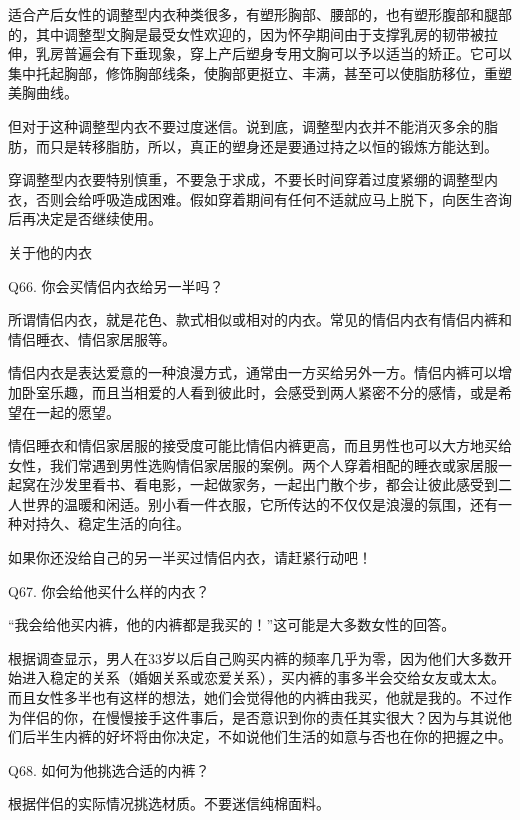 \documentclass[12pt,UTF8]{ctexbook}
\begin{document}
适合产后女性的调整型内衣种类很多，有塑形胸部、腰部的，也有塑形腹部和腿部的，其中调整型文胸是最受女性欢迎的，因为怀孕期间由于支撑乳房的韧带被拉伸，乳房普遍会有下垂现象，穿上产后塑身专用文胸可以予以适当的矫正。它可以集中托起胸部，修饰胸部线条，使胸部更挺立、丰满，甚至可以使脂肪移位，重塑美胸曲线。

但对于这种调整型内衣不要过度迷信。说到底，调整型内衣并不能消灭多余的脂肪，而只是转移脂肪，所以，真正的塑身还是要通过持之以恒的锻炼方能达到。

穿调整型内衣要特别慎重，不要急于求成，不要长时间穿着过度紧绷的调整型内衣，否则会给呼吸造成困难。假如穿着期间有任何不适就应马上脱下，向医生咨询后再决定是否继续使用。





关于他的内衣


Q66. 你会买情侣内衣给另一半吗？


所谓情侣内衣，就是花色、款式相似或相对的内衣。常见的情侣内衣有情侣内裤和情侣睡衣、情侣家居服等。

情侣内衣是表达爱意的一种浪漫方式，通常由一方买给另外一方。情侣内裤可以增加卧室乐趣，而且当相爱的人看到彼此时，会感受到两人紧密不分的感情，或是希望在一起的愿望。

情侣睡衣和情侣家居服的接受度可能比情侣内裤更高，而且男性也可以大方地买给女性，我们常遇到男性选购情侣家居服的案例。两个人穿着相配的睡衣或家居服一起窝在沙发里看书、看电影，一起做家务，一起出门散个步，都会让彼此感受到二人世界的温暖和闲适。别小看一件衣服，它所传达的不仅仅是浪漫的氛围，还有一种对持久、稳定生活的向往。

如果你还没给自己的另一半买过情侣内衣，请赶紧行动吧！





Q67. 你会给他买什么样的内衣？


“我会给他买内裤，他的内裤都是我买的！”这可能是大多数女性的回答。

根据调查显示，男人在33岁以后自己购买内裤的频率几乎为零，因为他们大多数开始进入稳定的关系（婚姻关系或恋爱关系），买内裤的事多半会交给女友或太太。而且女性多半也有这样的想法，她们会觉得他的内裤由我买，他就是我的。不过作为伴侣的你，在慢慢接手这件事后，是否意识到你的责任其实很大？因为与其说他们后半生内裤的好坏将由你决定，不如说他们生活的如意与否也在你的把握之中。





Q68. 如何为他挑选合适的内裤？


根据伴侣的实际情况挑选材质。不要迷信纯棉面料。
\end{document}
